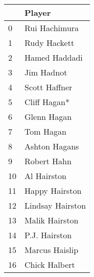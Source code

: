 \begin{tabular}{ll}
\toprule
{} &            Player \\
\midrule
0  &     Rui Hachimura \\
1  &      Rudy Hackett \\
2  &     Hamed Haddadi \\
3  &        Jim Hadnot \\
4  &     Scott Haffner \\
5  &      Cliff Hagan* \\
6  &       Glenn Hagan \\
7  &         Tom Hagan \\
8  &     Ashton Hagans \\
9  &       Robert Hahn \\
10 &       Al Hairston \\
11 &    Happy Hairston \\
12 &  Lindsay Hairston \\
13 &    Malik Hairston \\
14 &     P.J. Hairston \\
15 &    Marcus Haislip \\
16 &     Chick Halbert \\
\bottomrule
\end{tabular}
